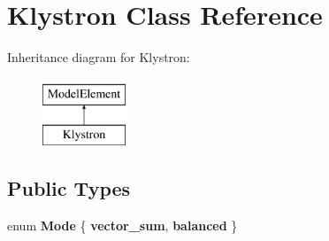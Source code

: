 \hypertarget{classKlystron}{}\section{Klystron Class Reference}
\label{classKlystron}
Inheritance diagram for Klystron\+:\begin{figure}[H]
\begin{center}
\leavevmode
\includegraphics[height=2.000000cm]{classKlystron}
\end{center}
\end{figure}
\subsection*{Public Types}
\begin{DoxyCompactItemize}
\item 
\mbox{\label{classKlystron_a54ec059b3d22e65d6eb333d94210c0aa}} 
enum {\bfseries Mode} \{ {\bfseries vector\+\_\+sum}, 
{\bfseries balanced}
 \}
\end{DoxyCompactItemize}

